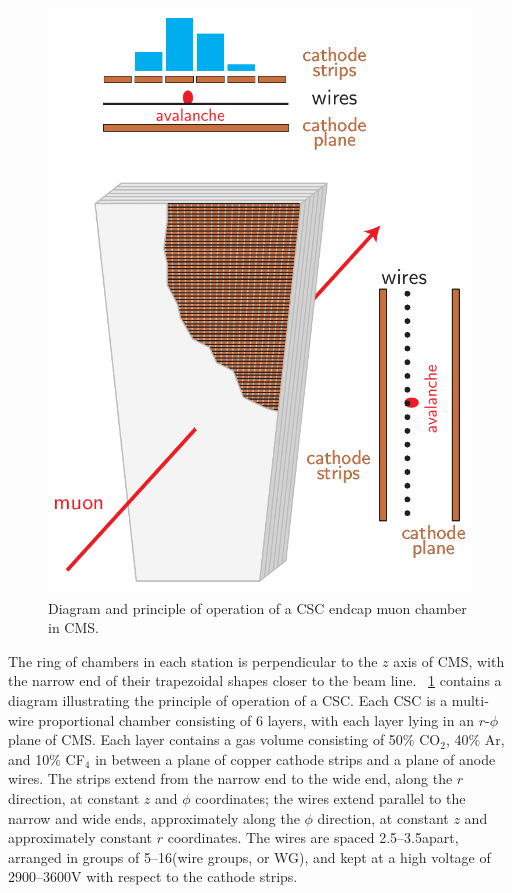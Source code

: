 \begin{figure}[p]
	\centering
	\includegraphics[width=\dummyFigWidth]{figures/neutron/fig_CSC.pdf}
	\caption{Diagram and principle of operation of a CSC endcap muon chamber in CMS.}
	\label{fig:CSC}
\end{figure}

The ring of chambers in each station is perpendicular to the $z$ axis of CMS, with the narrow end of their trapezoidal shapes closer to the beam line. \Fig~\ref{fig:CSC} contains a diagram illustrating the principle of operation of a CSC. Each CSC is a multi-wire proportional chamber consisting of 6 layers, with each layer lying in an $r$-$\phi$ plane of CMS. Each layer contains a gas volume consisting of 50\% CO$_2$, 40\% Ar, and 10\% CF$_4$ in between a plane of copper cathode strips and a plane of anode wires. The strips extend from the narrow end to the wide end, along the $r$ direction, at constant $z$ and $\phi$ coordinates; the wires extend parallel to the narrow and wide ends, approximately along the $\phi$ direction, at constant $z$ and approximately constant $r$ coordinates. The wires are spaced 2.5--3.5\mm apart, arranged in groups of 5--16\mm (wire groups, or WG), and kept at a high voltage of 2900--3600\unit{V} with respect to the cathode strips. 

